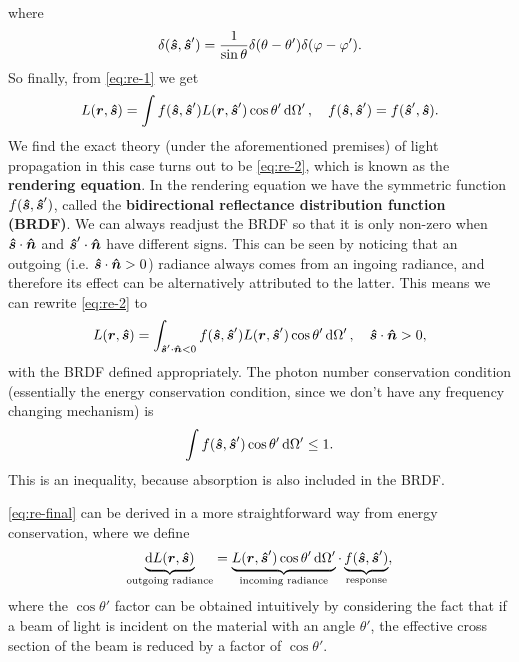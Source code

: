 \documentclass[hyperref, a4paper]{article}
\newcommand*{\concept}[1]{{\textbf{#1}}}
\begin{document}
where 
\begin{equation}
    \delta(\vu*{s}, \vu*{s}') = \frac{1}{\sin \theta} \delta(\theta - \theta') \delta(\varphi - \varphi'). 
\end{equation}
So finally, from \eqref{eq:re-1} we get 
\begin{equation}
    L(\vb*{r}, \vu*{s}) = \int f(\vu*{s}, \vu*{s}') L(\vb*{r}, \vu*{s}') \cos \theta' \dd{\Omega'}, 
    \quad f(\vu*{s}, \vu*{s}') = f(\vu*{s}', \vu*{s}).
    \label{eq:re-2}
\end{equation}
We find the exact theory (under the aforementioned premises) of light propagation 
in this case turns out to be \eqref{eq:re-2},
which is known as the \concept{rendering equation}. 
In the rendering equation we have the symmetric function $f(\vu*{s}, \vu*{s}')$,
called the \concept{bidirectional reflectance distribution function (BRDF)}. 
We can always readjust the BRDF so that it is only non-zero 
when $\vu*{s} \cdot \vu*{n}$ and $\vu*{s}' \cdot \vu*{n}$
have different signs. 
This can be seen by noticing that an outgoing (i.e. $\vu*{s} \cdot \vu*{n} > 0$) radiance 
always comes from an ingoing radiance, 
and therefore its effect can be alternatively attributed to the latter. 
This means we can rewrite \eqref{eq:re-2} to
\begin{equation}
    L(\vb*{r}, \vu*{s}) = \int_{\vu*{s}' \cdot \vu*{n} < 0} 
    f(\vu*{s}, \vu*{s}') L(\vb*{r}, \vu*{s}') \cos \theta' \dd{\Omega'}, \quad 
    \vu*{s} \cdot \vu*{n} > 0,
    \label{eq:re-final}
\end{equation}
with the BRDF defined appropriately.
The photon number conservation condition (essentially the energy conservation condition, 
since we don't have any frequency changing mechanism) is 
\begin{equation}
    \int f(\vu*{s}, \vu*{s}') \cos \theta' \dd{\Omega'}  \leq 1.
\end{equation}
This is an inequality, because absorption is also included in the BRDF.

\eqref{eq:re-final} can be derived in a more straightforward way 
from energy conservation, 
where we define 
\begin{equation}
    \underbrace{\dd{L(\vb*{r}, \vu*{s})}}_{\text{outgoing radiance}} 
    = \underbrace{L(\vb*{r}, \vu*{s}') \cos \theta' \dd{\Omega'}}_{\text{incoming radiance}} 
    \cdot \underbrace{f(\vu*{s}, \vu*{s}')}_{\text{response}} ,
\end{equation}
where the $\cos \theta'$ factor can be obtained intuitively 
by considering the fact that if a beam of light 
is incident on the material with an angle $\theta'$, 
the effective cross section of the beam is reduced by a factor of $\cos \theta'$.
\end{document}
